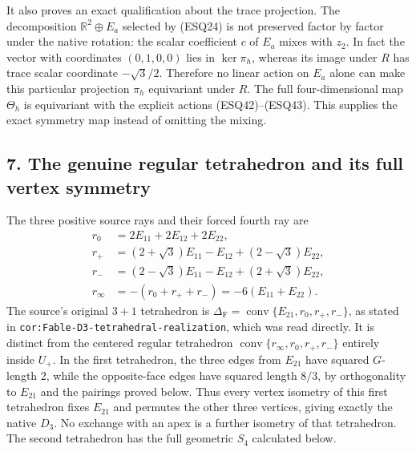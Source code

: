 \documentclass[
  10pt,
  a4paper,
]{article}
\begin{document}
It also proves an exact qualification about the trace projection. The
decomposition \(\mathbb R^2\oplus E_a\) selected by (ESQ24) is not
preserved factor by factor under the native rotation: the scalar
coefficient \(c\) of \(E_a\) mixes with \(z_2\). In fact the vector with
coordinates \((0,1,0,0)\) lies in \(\ker\pi_h\), whereas its image under
\(R\) has trace scalar coordinate \(-\sqrt3/2\). Therefore no linear
action on \(E_a\) alone can make this particular projection \(\pi_h\)
equivariant under \(R\). The full four-dimensional map \(\Theta_h\) is
equivariant with the explicit actions (ESQ42)--(ESQ43). This supplies
the exact symmetry map instead of omitting the mixing.

\subsection{7. The genuine regular tetrahedron and its full vertex
symmetry}\label{the-genuine-regular-tetrahedron-and-its-full-vertex-symmetry}

The three positive source rays and their forced fourth ray are \[
\begin{aligned}
r_0&=2E_{11}+2E_{12}+2E_{22},\\
r_+&=(2+\sqrt3)E_{11}-E_{12}+(2-\sqrt3)E_{22},\\
r_-&=(2-\sqrt3)E_{11}-E_{12}+(2+\sqrt3)E_{22},\\
r_\infty&=-(r_0+r_++r_-)=-6(E_{11}+E_{22}).
\end{aligned}
\tag{ESQ45}
\] The source's original \(3+1\) tetrahedron is
\(\Delta_{\mathrm F}=\operatorname{conv}\{E_{21},r_0,r_+,r_-\}\), as
stated in \texttt{cor:\allowbreak{}Fable-\allowbreak{}D3-\allowbreak{}tetrahedral-\allowbreak{}realization}, which was read
directly. It is distinct from the centered regular tetrahedron
\(\operatorname{conv}\{r_\infty,r_0,r_+,r_-\}\) entirely inside \(U_+\).
In the first tetrahedron, the three edges from \(E_{21}\) have squared
\(G\)-length 2, while the opposite-face edges have squared length
\(8/3\), by orthogonality to \(E_{21}\) and the pairings proved below.
Thus every vertex isometry of this first tetrahedron fixes \(E_{21}\)
and permutes the other three vertices, giving exactly the native
\(D_3\). No exchange with an apex is a further isometry of that
tetrahedron. The second tetrahedron has the full geometric \(S_4\)
calculated below.
\end{document}
